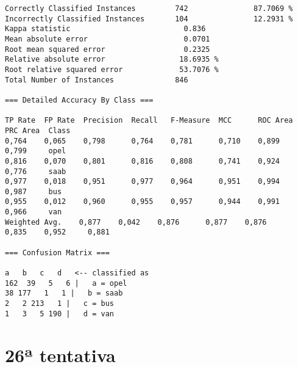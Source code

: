 \documentclass[
	article,			%
	11pt,				%
	oneside,			%
	a4paper,			%
	english,			%
	brazil,				%
	sumario=tradicional
	]{abntex2}
\begin{document}
\begin{lstlisting}
Correctly Classified Instances         742               87.7069 %
Incorrectly Classified Instances       104               12.2931 %
Kappa statistic                          0.836 
Mean absolute error                      0.0701
Root mean squared error                  0.2325
Relative absolute error                 18.6935 %
Root relative squared error             53.7076 %
Total Number of Instances              846     

=== Detailed Accuracy By Class ===

TP Rate  FP Rate  Precision  Recall   F-Measure  MCC      ROC Area  PRC Area  Class
0,764    0,065    0,798      0,764    0,781      0,710    0,899     0,799     opel
0,816    0,070    0,801      0,816    0,808      0,741    0,924     0,776     saab
0,977    0,018    0,951      0,977    0,964      0,951    0,994     0,987     bus
0,955    0,012    0,960      0,955    0,957      0,944    0,991     0,966     van
Weighted Avg.    0,877    0,042    0,876      0,877    0,876      0,835    0,952     0,881     

=== Confusion Matrix ===

a   b   c   d   <-- classified as
162  39   5   6 |   a = opel
38 177   1   1 |   b = saab
2   2 213   1 |   c = bus
1   3   5 190 |   d = van

\end{lstlisting}

\newpage

\section{26ª tentativa}
\end{document}
